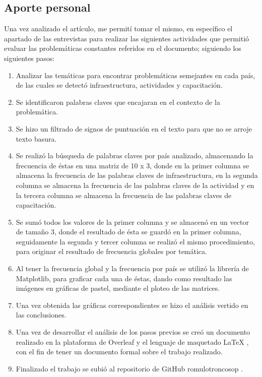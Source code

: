 \documentclass{article}
\begin{document}
\subsection{Aporte personal}
Una vez analizado el artículo, me permití tomar el mismo, en específico el apartado de las entrevistas para realizar las siguientes actividades que permitió evaluar las problemáticas constantes referidos en el documento; siguiendo los siguientes pasos:
\begin{enumerate}
    \item Analizar las temáticas para encontrar problemáticas semejantes en cada país, de las cuales se detectó infraestructura, actividades y capacitación.
    \item Se identificaron palabras claves que encajaran en el contexto de la problemática.
    \item Se hizo un filtrado de signos de puntuación en el texto para que no se arroje texto basura.
    \item Se realizó la búsqueda de palabras claves por país analizado, almacenando la frecuencia de éstas en una matriz de 10 x 3, donde en la primer columna se almacena la frecuencia de las palabras claves de infraestructura, en la segunda columna se almacena la frecuencia de las palabras claves de la actividad y en la tercera columna se almacena la frecuencia de las palabras claves de capacitación.
    \item Se sumó todos los valores de la primer columna y se almacenó en un vector de tamaño 3, donde el resultado de ésta se guardó en la primer columna, seguidamente la segunda y tercer columna se realizó el mismo procedimiento, para originar el resultado de frecuencia globales por temática.
    \item Al tener la frecuencia global y la frecuencia por país se utilizó la librería de Matplotlib, para graficar cada una de éstas, dando como resultado las imágenes en gráficas de pastel, mediante el ploteo de las matrices.
    \item Una vez obtenida las gráficas correspondientes se hizo el análisis vertido en las conclusiones.
    \item Una vez de desarrollar el análisis de los pasos previos se creó un documento realizado en la plataforma de Overleaf \citep{Overleaf} y el lenguaje de maquetado LaTeX \citep{latex}, con el fin de tener un documento formal sobre el trabajo realizado.
    \item Finalizado el trabajo se subió al repositorio de GitHub romulotroncosop \citep{Github}.
\end{enumerate}
\end{document}
